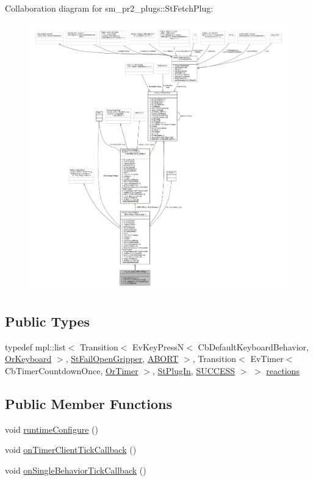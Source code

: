 Collaboration diagram for sm\+\_\+pr2\+\_\+plugs\+:\+:St\+Fetch\+Plug\+:
\nopagebreak
\begin{figure}[H]
\begin{center}
\leavevmode
\includegraphics[width=350pt]{structsm__pr2__plugs_1_1StFetchPlug__coll__graph}
\end{center}
\end{figure}
\subsection*{Public Types}
\begin{DoxyCompactItemize}
\item 
typedef mpl\+::list$<$ Transition$<$ Ev\+Key\+PressN$<$ Cb\+Default\+Keyboard\+Behavior, \hyperlink{classsm__pr2__plugs_1_1OrKeyboard}{Or\+Keyboard} $>$, \hyperlink{structsm__pr2__plugs_1_1StFailOpenGripper}{St\+Fail\+Open\+Gripper}, \hyperlink{classABORT}{A\+B\+O\+RT} $>$, Transition$<$ Ev\+Timer$<$ Cb\+Timer\+Countdown\+Once, \hyperlink{classsm__pr2__plugs_1_1OrTimer}{Or\+Timer} $>$, \hyperlink{structsm__pr2__plugs_1_1StPlugIn}{St\+Plug\+In}, \hyperlink{classSUCCESS}{S\+U\+C\+C\+E\+SS} $>$ $>$ \hyperlink{structsm__pr2__plugs_1_1StFetchPlug_a419655234103a8527bd89d0a02e1f0c0}{reactions}
\end{DoxyCompactItemize}
\subsection*{Public Member Functions}
\begin{DoxyCompactItemize}
\item 
void \hyperlink{structsm__pr2__plugs_1_1StFetchPlug_ab366cd931391170e7c7fa3e591c66d73}{runtime\+Configure} ()
\item 
void \hyperlink{structsm__pr2__plugs_1_1StFetchPlug_aaf8460a7e96dfbfe7eefbd3f2fd41b41}{on\+Timer\+Client\+Tick\+Callback} ()
\item 
void \hyperlink{structsm__pr2__plugs_1_1StFetchPlug_ae3dc2c0827bd1adb046f000e1caa4c4c}{on\+Single\+Behavior\+Tick\+Callback} ()
\end{DoxyCompactItemize}
